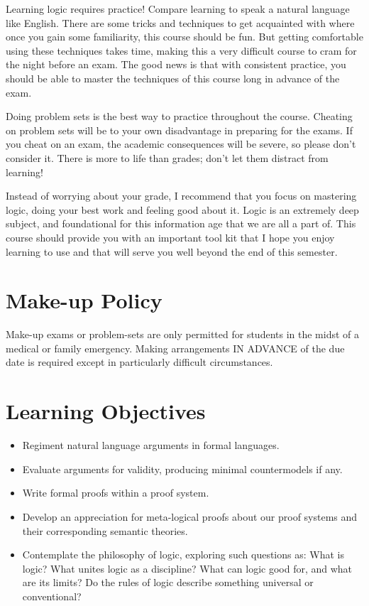 \documentclass[letterpaper]{inzane_syllabus} %
\begin{document}
Learning logic requires practice! 
Compare learning to speak a natural language like English. %
There are some tricks and techniques to get acquainted with where once you gain some familiarity, this course should be fun.
But getting comfortable using these techniques takes time, making this a very difficult course to cram for the night before an exam.
The good news is that with consistent practice, you should be able to master the techniques of this course long in advance of the exam.

Doing problem sets is the best way to practice throughout the course.
Cheating on problem sets will be to your own disadvantage in preparing for the exams.
If you cheat on an exam, the academic consequences will be severe, so please don't consider it.
There is more to life than grades; don't let them distract from learning!

Instead of worrying about your grade, I recommend that you focus on mastering logic, doing your best work and feeling good about it.
Logic is an extremely deep subject, and foundational for this information age that we are all a part of.
This course should provide you with an important tool kit that I hope you enjoy learning to use and that will serve you well beyond the end of this semester.

\vspace{0.5cm}
\section{Make-up Policy}

Make-up exams or problem-sets are only permitted for students in the midst of a medical or family emergency.
Making arrangements IN ADVANCE of the due date is required except in particularly difficult circumstances.

\vspace{0.5cm}
\section{Learning Objectives}

\begin{itemize}
  \item Regiment natural language arguments in formal languages.
  \item Evaluate arguments for validity, producing minimal countermodels if any.
  \item Write formal proofs within a proof system.
  \item Develop an appreciation for meta-logical proofs about our proof systems and their corresponding semantic theories.
  \item Contemplate the philosophy of logic, exploring such questions as: What is logic? What unites logic as a discipline? What can logic good for, and what are its limits? Do the rules of logic describe something universal or conventional?
\end{itemize}
\end{document}

